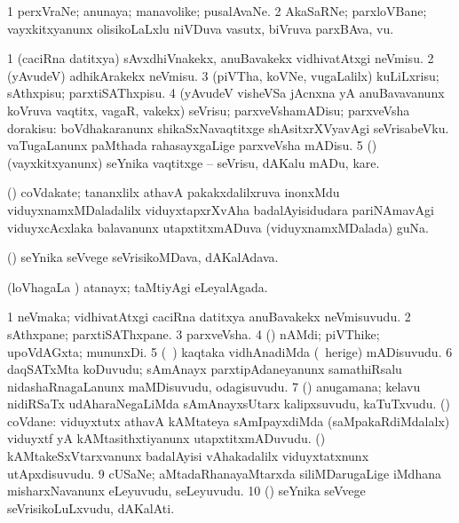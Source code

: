 \bentry
{}
\gl{\nA}
\bmng
\bnum
\num{1} perxVraNe; anunaya; manavolike; pusalAvaNe. 
\num{2} AkaSaRNe; parxloVBane; vayxkitxyanunx olisikoLaLxlu niVDuva vasutx, biVruva parxBAva, \mo vu. 
\enum
\emng
\eentry

\bentry
{}
\gl{\sakirx}
\bmng
\bnum
\num{1} (caciRna datitxya) sAvxdhiVnakekx, anuBavakekx vidhivatAtxgi neVmisu. 
\num{2} (yAvudeV) adhikArakekx neVmisu. 
\num{3} (piVTha, koVNe, \mo vugaLalilx) kuLiLxrisu; sAthxpisu; parxtiSAThxpisu. 
\num{4} (yAvudeV visheVSa jAcnxna yA anuBavavanunx koVruva vaqtitx, vagaR, \mo vakekx) seVrisu; parxveVshamADisu; parxveVsha dorakisu:  boVdhakaranunx shikaSxNavaqtitxge shAsitxrXVyavAgi seVrisabeVku.  vaTugaLanunx paMthada rahasayxgaLige parxveVsha mADisu. 
\num{5} (\ame) (vayxkitxyanunx) seYnika vaqtitxge -- seVrisu, dAKalu mADu, kare. 
\enum
\emng
\eentry

\bentry
{}
\gl{\nA}
\bmng
(\viduyx) coVdakate; tananxlilx athavA pakakxdalilxruva inonxMdu viduyxnamxMDaladalilx viduyxtapxrXvAha badalAyisidudara pariNAmavAgi viduyxcAcxlaka balavanunx utapxtitxmADuva (viduyxnamxMDalada) guNa. 
\emng
\eentry

\bentry
{}
\gl{\nA}
\bmng
(\ame) seYnika seVvege seVrisikoMDava, dAKalAdava. 
\emng
\eentry

\bentry
{}
\gl{\gu}
\bmng
(loVhagaLa \vi) atanayx; taMtiyAgi eLeyalAgada. 
\emng
\eentry

\bentry
{}
\gl{\nA}
\bmng
\bnum
\num{1} neVmaka; vidhivatAtxgi caciRna datitxya anuBavakekx neVmisuvudu. 
\num{2} sAthxpane; parxtiSAThxpane. 
\num{3} parxveVsha. 
\num{4} (\pArxparx) nAMdi; piVThike; upoVdAGxta; mununxDi. 
\num{5} (\kanmu\ \veYshA) kaqtaka vidhAnadiMda (\kanmu\ herige) mADisuvudu. 
\num{6} daqSATxMta koDuvudu; sAmAnayx parxtipAdaneyanunx samathiRsalu nidashaRnagaLanunx maMDisuvudu, odagisuvudu. 
\num{7} (\takaR) anugamana; kelavu nidiRSaTx udAharaNegaLiMda sAmAnayxsUtarx kalipxsuvudu, kaTuTxvudu. 
 (\Bwvi) coVdane: 
\banum
{} viduyxtutx athavA kAMtateya sAmIpayxdiMda (saMpakaRdiMdalalx) viduyxtf yA kAMtasithxtiyanunx utapxtitxmADuvudu. 
 (\Bwvi) kAMtakeSxVtarxvanunx badalAyisi vAhakadalilx viduyxtatxnunx utApxdisuvudu. 
\eanum
\numie
\num{9} cUSaNe; aMtadaRhanayaMtarxda siliMDarugaLige iMdhana misharxNavanunx eLeyuvudu, seLeyuvudu. 
\num{10} (\ame) seYnika seVvege seVrisikoLuLxvudu, dAKalAti. 
\enum
\emng
\eentry


